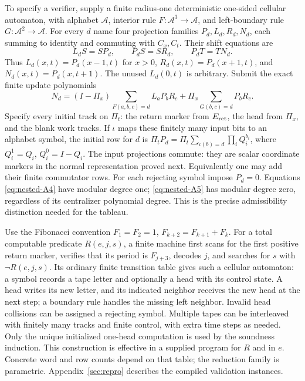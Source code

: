 To specify a verifier, supply a finite radius-one deterministic
one-sided cellular automaton, with alphabet $\mathcal A$, interior
rule $F:\mathcal A^3\to\mathcal A$, and left-boundary rule
$G:\mathcal A^2\to\mathcal A$. For every $d$ name four projection
families $P_d,L_d,R_d,N_d$, each summing to identity and commuting
with $C_x,C_t$. Their shift equations are
\begin{equation}
 L_dS=SP_d,\qquad P_dS=SR_d,\qquad P_dT=TN_d.                 \label{eq:nested-A4}
\end{equation}
Thus $L_d(x,t)=P_d(x-1,t)$ for $x>0$, $R_d(x,t)=P_d(x+1,t)$,
and $N_d(x,t)=P_d(x,t+1)$. The unused $L_d(0,t)$ is arbitrary.
Submit the exact finite update polynomials
\begin{equation}
 N_d=(I-\Pi_x)\sum_{F(a,b,c)=d}L_aP_bR_c
              +\Pi_x\sum_{G(b,c)=d}P_bR_c.                   \label{eq:nested-A5}
\end{equation}
Specify every initial track on $\Pi_t$: the return marker from
$E_{\rm ret}$, the head from $\Pi_x$, and the blank work tracks. If
$\iota$ maps these finitely many input bits to an alphabet symbol,
the initial row for $d$ is $\Pi_tP_d=\Pi_t\sum_{\iota(b)=d}\prod_iQ_i^{b_i}$,
where $Q_i^1=Q_i$, $Q_i^0=I-Q_i$. The input projections commute:
they are scalar coordinate markers in the normal representation
proved next. Equivalently one may add their finite commutator rows.
For each rejecting symbol impose $P_d=0$.
Equations \eqref{eq:nested-A4} have modular degree one; \eqref{eq:nested-A5} has modular degree zero,
regardless of its centralizer polynomial degree. This is the precise
admissibility distinction needed for the tableau.

Use the Fibonacci convention $F_1=F_2=1$, $F_{k+2}=F_{k+1}+F_k$. For a total computable predicate $R(e,j,s)$, a finite machine first
scans for the first positive return marker, verifies that its period
is $F_{j+3}$, decodes $j$, and searches for $s$ with $\neg R(e,j,s)$.
Its ordinary finite transition table gives such a cellular automaton:
a symbol records a tape letter and optionally a head with its control
state. A head writes its new letter, and its indicated neighbor receives
the new head at the next step; a boundary rule handles the missing
left neighbor. Invalid head collisions can be assigned a rejecting
symbol. Multiple tapes can be interleaved with finitely many tracks
and finite control, with extra time steps as needed. Only the unique
initialized one-head computation is used by the soundness induction.
This construction is effective in a supplied program for $R$ and in $e$.
Concrete word and row counts depend on that table; the reduction family is parametric. Appendix~\ref{sec:repro} describes the compiled validation instances.

